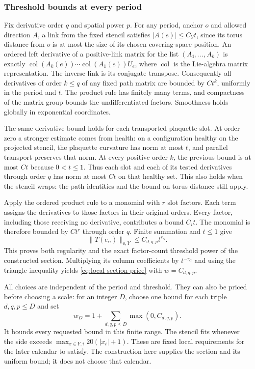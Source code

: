 \subsubsection{Threshold bounds at every period}
Fix derivative order $q$ and spatial power $p$. For any period,
anchor $o$ and allowed direction $A$, a link from the fixed stencil
satisfies $|A(e)|\le C_Yt$, since its torus distance from $o$ is
at most the size of its chosen covering-space position. An ordered
left derivative of a positive-link matrix for the list
$(A_1,\ldots,A_k)$ is exactly
$\operatorname{col}(A_k(e))\cdots\operatorname{col}(A_1(e))U_e$,
where $\operatorname{col}$ is the Lie-algebra matrix representation. The inverse link is its conjugate transpose.
Consequently all derivatives of order $k\le q$ of any fixed path
matrix are bounded by $C t^k$, uniformly in the period and $t$.
The product rule has finitely many terms, and compactness of the
matrix group bounds the undifferentiated factors. Smoothness holds
globally in exponential coordinates.

The same derivative bound holds for each transported plaquette
slot. At order zero a stronger estimate comes from health:
on a configuration healthy on the projected stencil, the plaquette
curvature has norm at most $t$, and parallel transport preserves
that norm. At every positive order $k$, the previous bound is at
most $Ct$ because $0<t\le1$. Thus each slot and each of its tested
derivatives through order $q$ has norm at most $C t$ on that
healthy set. This also holds when the stencil wraps: the path
identities and the bound on torus distance still apply.

Apply the ordered product rule to a monomial with $r$ slot factors.
Each term assigns the derivatives to those factors in their original
orders. Every factor, including those receiving no derivative,
contributes a bound $C_it$. The monomial is therefore bounded by
$C t^r$ through order $q$. Finite summation and $t\le1$ give
\begin{equation}\label{eq:local-section-column-price}
            \|T(e_\alpha)\|_{o,Y}\le C_{d,q,p}t^{r_\alpha}.
\end{equation}
This proves both regularity and the exact factor-count threshold
power of the constructed section. Multiplying its column
coefficients by $t^{-r_\alpha}$ and using the triangle inequality
yields \eqref{eq:local-section-price} with $w=C_{d,q,p}$.

All choices are independent of the period and threshold. They can
also be priced before choosing a scale: for an integer $D$, choose
one bound for each triple $d,q,p\le D$ and set
\[
     w_D=1+\sum_{d,q,p\le D}\max(0,C_{d,q,p}).
\]
It bounds every requested bound in this finite range. The stencil
fits whenever the side exceeds
$\max_{x\in Y,i}20(|x_i|+1)$. These are fixed local requirements
for the later calendar to satisfy. The construction here supplies
the section and its uniform bound; it does not choose that calendar.
